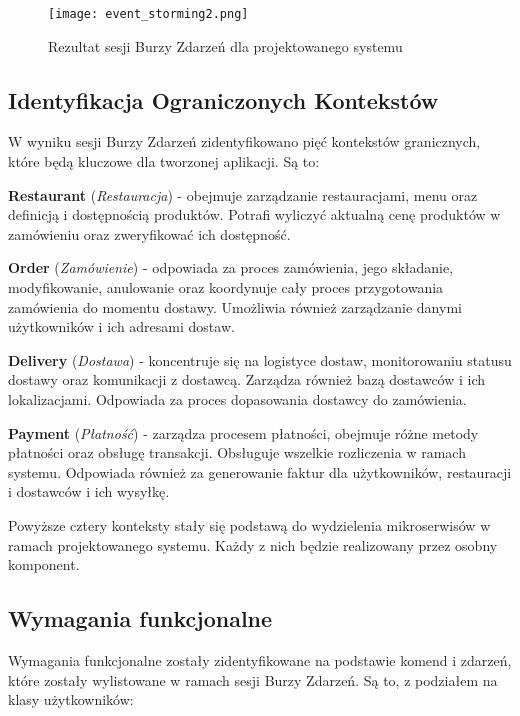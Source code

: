 \clearpage

\begin{figure}[!h]
    \centering \texttt{[image: event\_storming2.png]}
    \caption{Rezultat sesji Burzy Zdarzeń dla projektowanego systemu}
\end{figure}

\subsection{Identyfikacja Ograniczonych Kontekstów}

W wyniku sesji Burzy Zdarzeń zidentyfikowano pięć kontekstów granicznych, które będą kluczowe dla tworzonej aplikacji. Są to:

\textbf{Restaurant} (\textit{Restauracja}) - obejmuje zarządzanie restauracjami, menu oraz definicją i dostępnością produktów. Potrafi wyliczyć aktualną cenę produktów w zamówieniu oraz zweryfikować ich dostępność.

\textbf{Order} (\textit{Zamówienie}) - odpowiada za proces zamówienia, jego składanie, modyfikowanie, anulowanie oraz koordynuje cały proces przygotowania zamówienia do momentu dostawy. Umożliwia również zarządzanie danymi użytkowników i ich adresami dostaw.

\textbf{Delivery} (\textit{Dostawa}) - koncentruje się na logistyce dostaw, monitorowaniu statusu dostawy oraz komunikacji z dostawcą. Zarządza również bazą dostawców i ich lokalizacjami. Odpowiada za proces dopasowania dostawcy do zamówienia.

\textbf{Payment} (\textit{Płatność}) - zarządza procesem płatności, obejmuje różne metody płatności oraz obsługę transakcji. Obsługuje wszelkie rozliczenia w ramach systemu. Odpowiada również za generowanie faktur dla użytkowników, restauracji i dostawców i ich wysyłkę.

\medskip

Powyższe cztery konteksty stały się podstawą do wydzielenia mikroserwisów w ramach projektowanego systemu. Każdy z nich będzie realizowany przez osobny komponent.

\subsection{Wymagania funkcjonalne}

Wymagania funkcjonalne zostały zidentyfikowane na podstawie komend i zdarzeń, które zostały wylistowane w ramach sesji Burzy Zdarzeń. Są to, z podziałem na klasy użytkowników:

